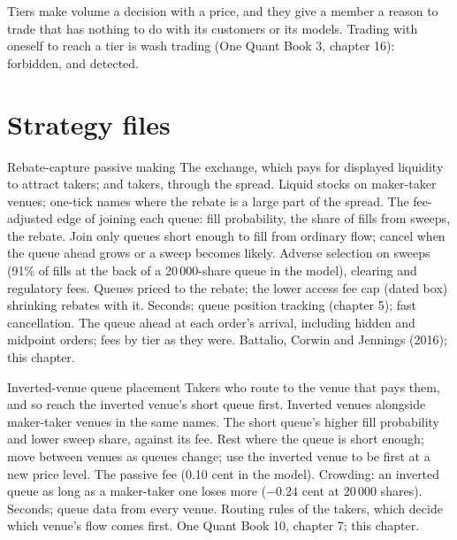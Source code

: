 Tiers make volume a decision with a price, and they give a member a reason to trade that has nothing to do with its customers or its models. Trading
with oneself to reach a tier is wash trading (One Quant Book 3, chapter 16): forbidden, and detected.

\section{Strategy files}

\begin{strategyfile}{Rebate-capture passive making}\label{strat:hf:rebates-inverted-venues-and-tiers:capture}
 The exchange, which pays for displayed liquidity to attract takers; and takers, through the spread.
 Liquid stocks on maker-taker venues; one-tick names where the rebate is a large part of the spread.
 The fee-adjusted edge of joining each queue: fill probability, the share of fills from sweeps, the rebate.
 Join only queues short enough to fill from ordinary flow; cancel when the queue ahead grows or a sweep becomes likely.
 Adverse selection on sweeps (91\% of fills at the back of a 20\,000-share queue in the model), clearing and regulatory fees.
 Queues priced to the rebate; the lower access fee cap (dated box) shrinking rebates with it.
 Seconds; queue position tracking (chapter 5); fast cancellation.
 The queue ahead at each order's arrival, including hidden and midpoint orders; fees by tier as they were.
 Battalio, Corwin and Jennings (2016); this chapter.
\end{strategyfile}

\begin{strategyfile}{Inverted-venue queue placement}\label{strat:hf:rebates-inverted-venues-and-tiers:inverted}
 Takers who route to the venue that pays them, and so reach the inverted venue's short queue first.
 Inverted venues alongside maker-taker venues in the same names.
 The short queue's higher fill probability and lower sweep share, against its fee.
 Rest where the queue is short enough; move between venues as queues change; use the inverted venue to be first at a new
price level.
 The passive fee (0.10 cent in the model).
 Crowding: an inverted queue as long as a maker-taker one loses more ($-0.24$ cent at 20\,000 shares).
 Seconds; queue data from every venue.
 Routing rules of the takers, which decide which venue's flow comes first.
 One Quant Book 10, chapter 7; this chapter.
\end{strategyfile}

